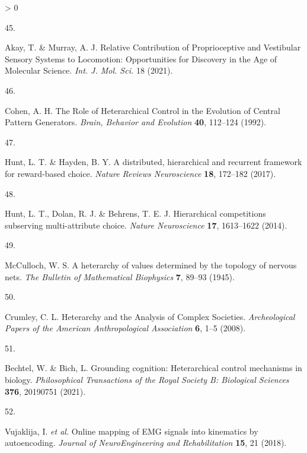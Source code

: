 \documentclass[
  a4paper,
]{article}
\newlength{\cslhangindent}
\newlength{\csllabelwidth}
\newenvironment{CSLReferences}[2] %
 {%
  \setlength{\parindent}{0pt}
  \ifodd #1 \everypar{\setlength{\hangindent}{\cslhangindent}}\ignorespaces\fi
  \ifnum #2 > 0
  \setlength{\parskip}{#2\baselineskip}
  \fi
 }%
 {}
\newcommand{\CSLLeftMargin}[1]{\parbox[t]{\csllabelwidth}{#1}}
\newcommand{\CSLRightInline}[1]{\parbox[t]{\linewidth - \csllabelwidth}{#1}\break}
\begin{document}
\begin{CSLReferences}{0}{0}
\leavevmode\hypertarget{ref-akayRelativeContributionProprioceptive2021}{}%
\CSLLeftMargin{45. }
\CSLRightInline{Akay, T. \& Murray, A. J. Relative {Contribution} of
{Proprioceptive} and {Vestibular Sensory Systems} to {Locomotion}:
{Opportunities} for {Discovery} in the {Age} of {Molecular Science}.
\emph{Int. J. Mol. Sci.} 18 (2021).}

\leavevmode\hypertarget{ref-cohenRoleHeterarchicalControl1992}{}%
\CSLLeftMargin{46. }
\CSLRightInline{Cohen, A. H. The {Role} of {Heterarchical Control} in
the {Evolution} of {Central Pattern Generators}. \emph{Brain, Behavior
and Evolution} \textbf{40}, 112--124 (1992).}

\leavevmode\hypertarget{ref-huntDistributedHierarchicalRecurrent2017}{}%
\CSLLeftMargin{47. }
\CSLRightInline{Hunt, L. T. \& Hayden, B. Y. A distributed, hierarchical
and recurrent framework for reward-based choice. \emph{Nature Reviews
Neuroscience} \textbf{18}, 172--182 (2017).}

\leavevmode\hypertarget{ref-huntHierarchicalCompetitionsSubserving2014}{}%
\CSLLeftMargin{48. }
\CSLRightInline{Hunt, L. T., Dolan, R. J. \& Behrens, T. E. J.
Hierarchical competitions subserving multi-attribute choice.
\emph{Nature Neuroscience} \textbf{17}, 1613--1622 (2014).}

\leavevmode\hypertarget{ref-mccullochHeterarchyValuesDetermined1945}{}%
\CSLLeftMargin{49. }
\CSLRightInline{McCulloch, W. S. A heterarchy of values determined by
the topology of nervous nets. \emph{The Bulletin of Mathematical
Biophysics} \textbf{7}, 89--93 (1945).}

\leavevmode\hypertarget{ref-crumleyHeterarchyAnalysisComplex2008}{}%
\CSLLeftMargin{50. }
\CSLRightInline{Crumley, C. L. Heterarchy and the {Analysis} of {Complex
Societies}. \emph{Archeological Papers of the American Anthropological
Association} \textbf{6}, 1--5 (2008).}

\leavevmode\hypertarget{ref-bechtelGroundingCognitionHeterarchical2021}{}%
\CSLLeftMargin{51. }
\CSLRightInline{Bechtel, W. \& Bich, L. Grounding cognition:
Heterarchical control mechanisms in biology. \emph{Philosophical
Transactions of the Royal Society B: Biological Sciences} \textbf{376},
20190751 (2021).}

\leavevmode\hypertarget{ref-vujaklijaOnlineMappingEMG2018}{}%
\CSLLeftMargin{52. }
\CSLRightInline{Vujaklija, I. \emph{et al.} Online mapping of {EMG}
signals into kinematics by autoencoding. \emph{Journal of
NeuroEngineering and Rehabilitation} \textbf{15}, 21 (2018).}


\end{CSLReferences}
\end{document}
